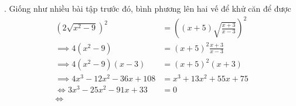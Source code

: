 . Giống như nhiều bài tập trước đó, bình phương lên hai vế để khử căn để được
\begin{align*}
   \left(2\sqrt{x^2 - 9}\right)^2 &= \left((x + 5)\sqrt{\frac{x+3}{x-3}}\right)^2 \\ 
   \implies 4\left(x^2-9\right) &= (x + 5)^2\frac{x+3}{x-3}\\
   \implies 4\left(x^2-9\right)(x - 3) &= (x + 5)^2(x + 3) \\
   \implies 4x^3 - 12x^2 - 36x + 108 &= x^3 + 13x^2 + 55x + 75 \\
   \iff 3x^3 - 25x^2 - 91x + 33 &= 0 \\
   \iff 
\end{align*}



